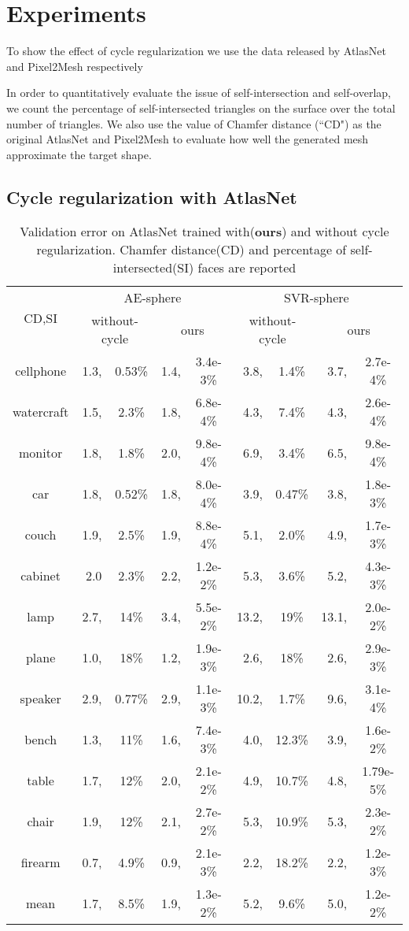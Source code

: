 \section{Experiments}

 To show the effect of cycle regularization we use the data released by AtlasNet and Pixel2Mesh respectively \cite{3DR2N2}

In order to quantitatively evaluate the issue of self-intersection and self-overlap, we count the percentage of self-intersected triangles on the surface over the total number of triangles. We also use the value of Chamfer distance (``CD") as the original AtlasNet and Pixel2Mesh to evaluate how well the generated mesh approximate the target shape.
\subsection{Cycle regularization with AtlasNet}

\begin{table*}
	\caption{Validation error on AtlasNet trained with(\textbf{ours}) and without cycle regularization. Chamfer distance(CD) and percentage of self-intersected(SI) faces are reported}
	\label{tab:seg}
	\centering
	\begin{tabular}{c|rc|rc|rc|rc|}
    \multirow{2}{*}{CD,SI} &\multicolumn{4}{c|}{AE-sphere}&\multicolumn{4}{c}{SVR-sphere}\\
	\cline{2-9}
	~& \multicolumn{2}{c|}{without-cycle} & \multicolumn{2}{c|}{ours} & \multicolumn{2}{c|}{without-cycle} & \multicolumn{2}{c|}{ours} \\
	\hline
	cellphone&1.3,&0.53\%&1.4,&3.4e-3\%&3.8,&1.4\%&3.7,&2.7e-4\%\\
	watercraft&1.5,&2.3\%&1.8,&6.8e-4\%&4.3,&7.4\%&4.3,&2.6e-4\%\\
	monitor&1.8,&1.8\%&2.0,&9.8e-4\%&6.9,&3.4\%&6.5,&9.8e-4\%\\
	car&1.8,&0.52\%&1.8,&8.0e-4\%&3.9,&0.47\%&3.8,&1.8e-3\%\\
	couch&1.9,&2.5\%&1.9,&8.8e-4\%&5.1,&2.0\%&4.9,&1.7e-3\%\\
	cabinet&2.0&2.3\%&2.2,&1.2e-2\%&5.3,&3.6\%&5.2,&4.3e-3\%\\
	lamp&2.7,&14\%&3.4,&5.5e-2\%&13.2,&19\%&13.1,&2.0e-2\%\\
	plane&1.0,&18\%&1.2,&1.9e-3\%&2.6,&18\%&2.6,&2.9e-3\%\\
	speaker&2.9,&0.77\%&2.9,&1.1e-3\%&10.2,&1.7\%&9.6,&3.1e-4\%\\
	bench&1.3,&11\%&1.6,&7.4e-3\%&4.0,&12.3\%&3.9,&1.6e-2\%\\
	table&1.7,&12\%&2.0,&2.1e-2\%&4.9,&10.7\%&4.8,&1.79e-5\%\\
	chair&1.9,&12\%&2.1,&2.7e-2\%&5.3,&10.9\%&5.3,&2.3e-2\%\\
	firearm&0.7,&4.9\%&0.9,&2.1e-3\%&2.2,&18.2\%&2.2,&1.2e-3\%\\
	\hline
	mean &1.7,&8.5\%&1.9,& 1.3e-2\% &5.2,&9.6\%&5.0,&1.2e-2\%\\
		
	\end{tabular}
\end{table*}
		
